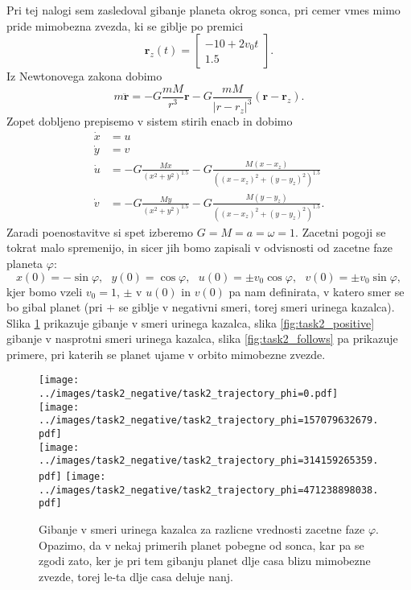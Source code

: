 \documentclass[11pt, a4paper]{article}
\begin{document}
    Pri tej nalogi sem zasledoval gibanje planeta okrog sonca, pri cemer vmes mimo pride mimobezna zvezda, ki se giblje po
    premici $$\mathbf{r}_z(t) = \begin{bmatrix}-10 + 2v_0 t\\ 1.5 \end{bmatrix}.$$ Iz Newtonovega zakona dobimo
    $$ m\ddot{\mathbf{r}} = -G \frac{mM}{r^3} \mathbf{r} - G\frac{mM}{|r - r_z|^3} (\mathbf{r} - \mathbf{r}_z).$$
    Zopet dobljeno prepisemo v sistem stirih enacb in dobimo
    \begin{align*}
        \dot{x} &= u\\
        \dot{y} &= v\\
        \dot{u} &= - G \frac{Mx}{(x^2 + y^2)^1.5} - G \frac{M(x-x_z)}{\left( (x-x_z)^2 + (y-y_z)^2 \right)^1.5}\\
        \dot{v} &= - G \frac{My}{(x^2 + y^2)^1.5} - G \frac{M(y-y_z)}{\left( (x-x_z)^2 + (y-y_z)^2 \right)^1.5}.
    \end{align*}
    Zaradi poenostavitve si spet izberemo $G = M = a = \omega = 1$. Zacetni pogoji se tokrat malo spremenijo, in sicer jih bomo
    zapisali v odvisnosti od zacetne faze planeta $\varphi$:
    $$ x(0) = -\sin \varphi,~~~ y(0) = \cos \varphi,~~~ u(0) = \pm v_0 \cos \varphi, ~~~ v(0) = \pm v_0 \sin\varphi,$$
    kjer bomo vzeli $v_0 = 1$, $\pm$ v $u(0)$ in $v(0)$ pa nam definirata, v katero smer se bo gibal planet (pri $+$ se giblje v negativni smeri, torej
    smeri urinega kazalca). Slika \ref{fig:task2_negative} prikazuje gibanje v smeri urinega kazalca, slika \ref{fig:task2_positive} gibanje v nasprotni smeri
    urinega kazalca, slika \ref{fig:task2_follows} pa prikazuje primere, pri katerih se planet ujame v orbito mimobezne zvezde.
    
    \begin{figure}[H]
        \centering
        \texttt{[image: ../images/task2\_negative/task2\_trajectory\_phi=0.pdf]}
        \texttt{[image: ../images/task2\_negative/task2\_trajectory\_phi=157079632679.pdf]}\\
        \texttt{[image: ../images/task2\_negative/task2\_trajectory\_phi=314159265359.pdf]}
        \texttt{[image: ../images/task2\_negative/task2\_trajectory\_phi=471238898038.pdf]}
        \caption{Gibanje v smeri urinega kazalca za razlicne vrednosti zacetne faze $\varphi$. Opazimo, da v nekaj primerih planet pobegne od sonca, kar pa se zgodi zato,
        ker je pri tem gibanju planet dlje casa blizu mimobezne zvezde, torej le-ta dlje casa deluje nanj.}
        \label{fig:task2_negative}
    \end{figure}
\end{document}
